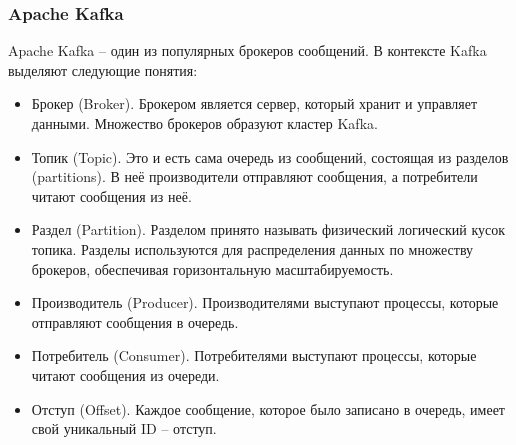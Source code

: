 %
%

\subsubsection{Apache Kafka}\label{subsubsec:domain:apache-kafka}
Apache Kafka -- один из популярных брокеров сообщений.
В контексте Kafka выделяют следующие понятия:
\begin{itemize}
    \item Брокер (Broker).
    Брокером является сервер, который хранит и управляет данными.
    Множество брокеров образуют кластер Kafka.
    \item Топик (Topic).
    Это и есть сама очередь из сообщений, состоящая из разделов (partitions).
    В неё производители отправляют сообщения, а потребители читают сообщения из неё.
    \item Раздел (Partition).
    Разделом принято называть физический логический кусок топика.
    Разделы используются для распределения данных по множеству брокеров, обеспечивая горизонтальную масштабируемость.
    \item Производитель (Producer).
    Производителями выступают процессы, которые отправляют сообщения в очередь.
    \item Потребитель (Consumer).
    Потребителями выступают процессы, которые читают сообщения из очереди.
    \item Отступ (Offset).
    Каждое сообщение, которое было записано в очередь, имеет свой уникальный ID -- отступ.
\end{itemize}

